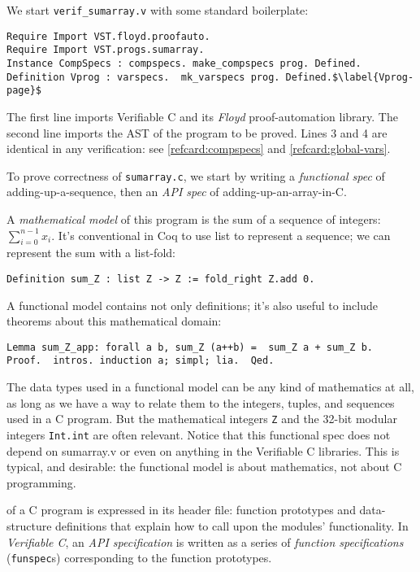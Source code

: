 \documentclass[12pt,fleqn,openany,oneside,showtrims]{memoir}
\begin{document}
We start \lstinline{verif_sumarray.v}
with some standard boilerplate:\label{refcard:boilerplate}
\begin{lstlisting}
Require Import VST.floyd.proofauto.
Require Import VST.progs.sumarray.
Instance CompSpecs : compspecs. make_compspecs prog. Defined.
Definition Vprog : varspecs.  mk_varspecs prog. Defined.$\label{Vprog-page}$
\end{lstlisting}
The first line imports Verifiable C and its \emph{Floyd} proof-automation library.  The second line imports the AST of the program to be proved.  Lines 3 and 4 are identical in any verification:
see \autoref{refcard:compspecs} and \autoref{refcard:global-vars}.

To prove correctness of \lstinline{sumarray.c},
we start by writing a \emph{functional spec} of adding-up-a-sequence,
then an \emph{API spec} of adding-up-an-array-in-C.

A \emph{mathematical model} of this program is the sum of a sequence
of integers: $\sum_{i=0}^{n-1}x_i$.  It's conventional in Coq to use
\textsf{list} to represent a sequence; we can represent the sum
with a list-fold:
\begin{lstlisting}
Definition sum_Z : list Z -> Z := fold_right Z.add 0.
\end{lstlisting}
A functional model contains not only definitions; it's also
useful to include theorems about this mathematical domain:
\begin{lstlisting}
Lemma sum_Z_app: forall a b, sum_Z (a++b) =  sum_Z a + sum_Z b.
Proof.  intros. induction a; simpl; lia.  Qed.
\end{lstlisting}
The data types used in a functional model can be any kind of mathematics
at all, as long as we have a way to relate them to the integers,
tuples, and sequences used in a C program.  But the mathematical integers
\lstinline{Z} and the 32-bit modular integers
\lstinline{Int.int} are often relevant.
Notice that this functional spec does not depend
on sumarray.v or even on anything in the Verifiable C libraries.
This is typical, and desirable:
the functional model is about mathematics,
not about C programming.

 of a C program is
expressed in its header file: function prototypes and data-structure
definitions that explain how to call upon the modules' functionality.
In \emph{Verifiable C}, an \emph{API specification} is written as a
series of \emph{function specifications} (\lstinline{funspec}s)
corresponding to the function prototypes.
\end{document}
